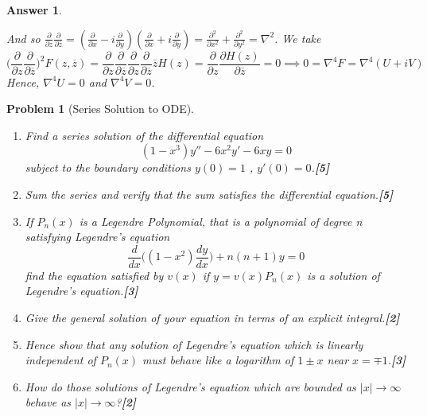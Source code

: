 \documentclass[a4paper]{article}
\newtheorem{ans}{Answer}[section]
\theoremstyle{new}
\newtheorem{qns}{Problem}[section]
\begin{document}
\begin{ans}
\begin{enumerate}[label=(\roman*)]
And so $\frac{\partial}{\partial z}\frac{\partial}{\partial\overline{z}}=(\frac{\partial}{\partial x}-i\frac{\partial}{\partial y})(\frac{\partial}{\partial x}+i\frac{\partial}{\partial y})=\frac{\partial^2}{\partial x^2}+\frac{\partial^2}{\partial y^2}=\nabla^2$.  We take 
$$\bigg(\frac{\partial}{\partial z}\frac{\partial}{\partial\overline{z}}\bigg)^2F(z,\overline{z})=\frac{\partial}{\partial z}\frac{\partial}{\partial\overline{z}}\frac{\partial}{\partial z}\frac{\partial}{\partial\overline{z}}\overline{z}H(z)=\frac{\partial}{\partial z}\frac{\partial H(z)}{\partial\overline{z}}=0\implies0=\nabla^4F=\nabla^4(U+iV)$$
Hence, $\nabla^4U=0$ and $\nabla^4V=0$.
\end{enumerate}
\end{ans}
\newpage
\begin{qns}[Series Solution to ODE]\leavevmode
\begin{enumerate}[label=(\roman*)]
\item Find a series solution of the differential equation
$$(1-x^3)y''-6x^2y'-6xy=0$$
subject to the boundary conditions $y(0) = 1$ , $y'(0)=0$.\hfill \textbf{[5]}
\item Sum the series and verify that the sum satisfies the differential equation.\hfill \textbf{[5]}
\item If $P_n(x)$ is a Legendre Polynomial, that is a polynomial of degree n satisfying Legendre’s equation
$$\frac{d}{dx}\bigg((1-x^2)\frac{dy}{dx}\bigg)+n(n+1)y=0$$
find the equation satisfied by $v(x)$ if $y = v(x)P_n(x)$ is a solution of Legendre’s equation.\hfill \textbf{[3]}
\item Give the general solution of your equation in terms of an explicit integral.\hfill \textbf{[2]}
\item Hence show that any solution of Legendre’s equation which is linearly independent of $P_n(x)$ must behave like a logarithm of $1\pm x$ near $x=\mp1$.\hfill \textbf{[3]}
\item How do those solutions of Legendre’s equation which are bounded as $|x|\rightarrow\infty$ behave
as $|x|\rightarrow\infty$?\hfill \textbf{[2]}
\end{enumerate}
\end{qns}
\end{document}
